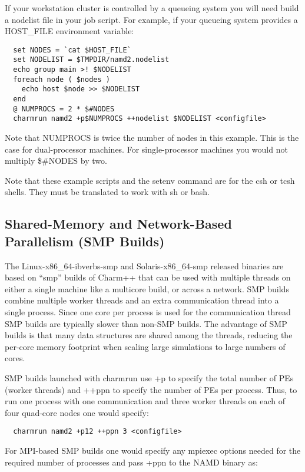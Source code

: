 If your workstation cluster is controlled by a queueing system you
will need build a nodelist file in your job script.  For example, if
your queueing system provides a HOST\_FILE environment variable:

\begin{verbatim}
  set NODES = `cat $HOST_FILE`
  set NODELIST = $TMPDIR/namd2.nodelist
  echo group main >! $NODELIST
  foreach node ( $nodes )
    echo host $node >> $NODELIST
  end
  @ NUMPROCS = 2 * $#NODES
  charmrun namd2 +p$NUMPROCS ++nodelist $NODELIST <configfile>
\end{verbatim}

Note that NUMPROCS is twice the number of nodes in this example.
This is the case for dual-processor machines.  For single-processor
machines you would not multiply \$\#NODES by two.

Note that these example scripts and the setenv command are for the csh
or tcsh shells.  They must be translated to work with sh or bash.

\subsection{Shared-Memory and Network-Based Parallelism (SMP Builds)}

The Linux-x86\_64-ibverbs-smp and Solaris-x86\_64-smp released binaries are
based on ``smp'' builds of Charm++ that can be used with multiple threads
on either a single machine like a multicore build, or across a network.
SMP builds combine multiple worker threads and an extra communication
thread into a single process.  Since one core per process is used for
the communication thread SMP builds are typically slower than non-SMP
builds.  The advantage of SMP builds is that many data structures are
shared among the threads, reducing the per-core memory footprint when
scaling large simulations to large numbers of cores.

SMP builds launched with charmrun use +p to specify the total number of
PEs (worker threads) and ++ppn to specify the number of PEs per process.
Thus, to run one process with one communication and three worker threads
on each of four quad-core nodes one would specify:

\begin{verbatim}
  charmrun namd2 +p12 ++ppn 3 <configfile>
\end{verbatim}

For MPI-based SMP builds one would specify any mpiexec options needed
for the required number of processes and pass +ppn to the NAMD binary as:

